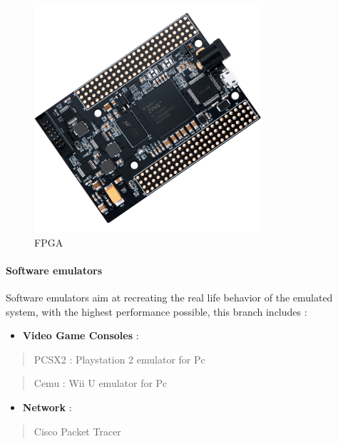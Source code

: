 \documentclass[
  14pt,
  english,
  a4paper,
]{scrreprt}
\providecommand{\tightlist}{%
  \setlength{\itemsep}{0pt}\setlength{\parskip}{0pt}}
\begin{document}
\begin{figure}
\centering
\includegraphics[width=0.75\textwidth,height=\textheight]{figures/Fpga-chip.png}
\caption{FPGA}
\end{figure}

\hypertarget{software-emulators}{%
\paragraph{Software emulators}\label{software-emulators}}

Software emulators aim at recreating the real life behavior of the
emulated system, with the highest performance possible, this branch
includes :

\begin{itemize}
\tightlist
\item
  \textbf{Video Game Consoles} :
\end{itemize}

\begin{quote}
PCSX2 : Playstation 2 emulator for Pc
\end{quote}

\begin{quote}
Cemu : Wii U emulator for Pc
\end{quote}

\begin{itemize}
\tightlist
\item
  \textbf{Network} :
\end{itemize}

\begin{quote}
Cisco Packet Tracer
\end{quote}
\end{document}
